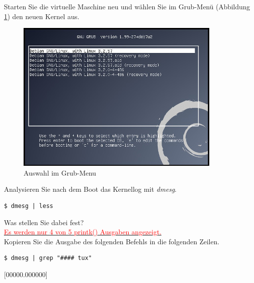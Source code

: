 Starten Sie die virtuelle Maschine neu und wählen Sie im Grub-Menü (Abbildung \ref{boot_grub2}) den neuen Kernel aus.
\begin{figure}[h!]
   \begin{center}
      \includegraphics{images/boot_grub}
   \end{center}
   \caption{Auswahl im Grub-Menu}
   \label{boot_grub2}
\end{figure}

Analysieren Sie nach dem Boot das Kernellog mit \emph{dmesg}.

\begin{lstlisting}
$ dmesg | less
\end{lstlisting}

Was stellen Sie dabei fest? \\

\underline{\textcolor{red}{Es werden nur 4 von 5 printk() Ausgaben angezeigt.}\hspace{0.5\textwidth}} \\

Kopieren Sie die Ausgabe des folgenden Befehls in die folgenden Zeilen.
\begin{lstlisting}
$ dmesg | grep "#### tux"
\end{lstlisting}

[00000.000000] \underline{} \newline
[00000.000000] \underline{} \newline
[00000.000000] \underline{} \newline
[00000.000000] \underline{} \newline
[00000.000000] \underline{\hspace{0.5\textwidth}} \newline
[00000.000000] \underline{\hspace{0.5\textwidth}} \newline
[00000.000000] \underline{\hspace{0.5\textwidth}} \newline

